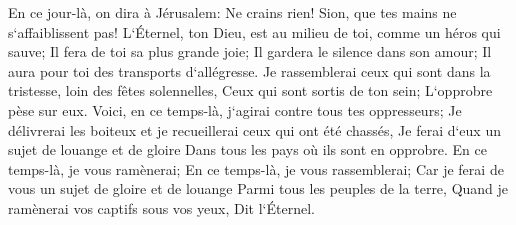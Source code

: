 \verse En ce jour-là, on dira à Jérusalem: Ne crains rien! Sion, que tes mains ne s`affaiblissent pas! 
\verse L`Éternel, ton Dieu, est au milieu de toi, comme un héros qui sauve; Il fera de toi sa plus grande joie; Il gardera le silence dans son amour; Il aura pour toi des transports d`allégresse. 
\verse Je rassemblerai ceux qui sont dans la tristesse, loin des fêtes solennelles, Ceux qui sont sortis de ton sein; L`opprobre pèse sur eux. 
\verse Voici, en ce temps-là, j`agirai contre tous tes oppresseurs; Je délivrerai les boiteux et je recueillerai ceux qui ont été chassés, Je ferai d`eux un sujet de louange et de gloire Dans tous les pays où ils sont en opprobre. 
\verse En ce temps-là, je vous ramènerai; En ce temps-là, je vous rassemblerai; Car je ferai de vous un sujet de gloire et de louange Parmi tous les peuples de la terre, Quand je ramènerai vos captifs sous vos yeux, Dit l`Éternel. 
